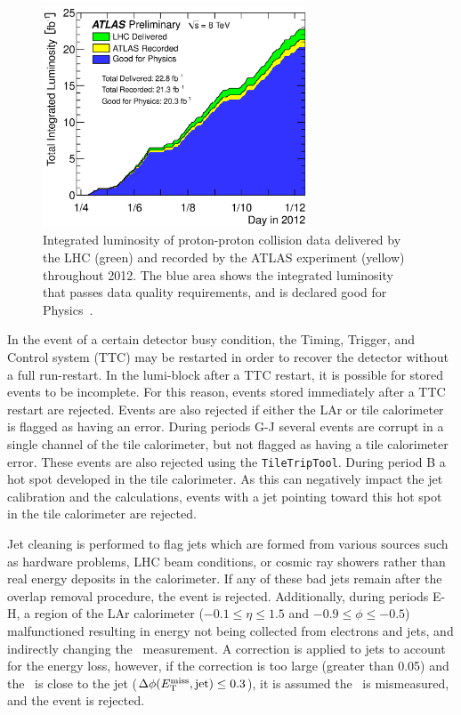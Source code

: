 \begin{figure}
  \centering
  \includegraphics[width=0.7\textwidth]{figs/lhc/intlumivstime2012DQ.eps}
  \caption{
    Integrated luminosity of proton-proton collision data delivered by
    the LHC (green) and recorded by the ATLAS experiment (yellow) throughout
    2012.
    The blue area shows the integrated luminosity that passes data quality
    requirements, and is declared good for Physics~\cite{atlas-lumi}.
  }
  \label{fig:int_lumi}
\end{figure}

In the event of a certain detector busy condition, the Timing, Trigger, and
Control system (TTC) may be restarted in order to recover the detector without
a full run-restart.
In the lumi-block after a TTC restart, it is possible for stored events to be
incomplete.
For this reason, events stored immediately after a TTC restart are rejected.
Events are also rejected if either the LAr or tile calorimeter is
flagged as having an error.
During periods G-J several events are corrupt in a single channel of the tile
calorimeter, but not flagged as having a tile calorimeter error.
These events are also rejected using the \texttt{TileTripTool}.
During period B a hot spot developed in the tile calorimeter.
As this can negatively impact the jet calibration and the \met calculations,
events with a jet pointing toward this hot spot in the tile calorimeter are
rejected.

Jet cleaning is performed to flag jets which are formed from various sources
such as hardware problems, LHC beam conditions, or cosmic ray showers rather
than real energy deposits in the calorimeter.
If any of these bad jets remain after the overlap removal procedure, the event
is rejected.
Additionally, during periods E-H, a region of the LAr
calorimeter ($-0.1\le\eta\le1.5$ and $-0.9\le\phi\le-0.5$) malfunctioned
resulting in energy not being collected from electrons and jets, and
indirectly changing the \met\ measurement.
A correction is applied to jets to account for the energy loss,
however, if the correction is too large (greater than 0.05) and the \met\ is
close to the jet ($\Delta\phi(E_{\mathrm{T}}^{\mathrm{miss}}, \text{jet}) \le 0.3$), it is assumed the
\met\ is mismeasured, and the event is rejected.


